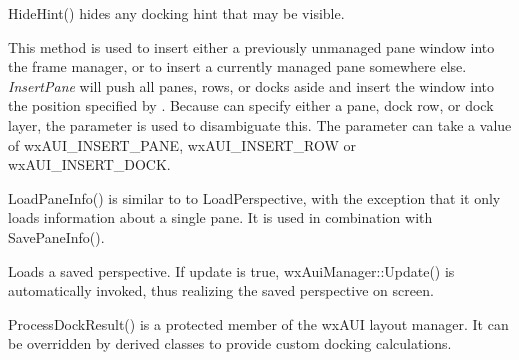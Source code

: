 
HideHint() hides any docking hint that may be visible.

\label{wxauimanagerinsertpane}


This method is used to insert either a previously unmanaged pane window
into the frame manager, or to insert a currently managed pane somewhere 
else. {\it InsertPane} will push all panes, rows, or docks aside and
insert the window into the position specified by . 
Because  can specify either a pane, dock row, or dock
layer, the  parameter is used to disambiguate this. The
parameter  can take a value of wxAUI\_INSERT\_PANE, wxAUI\_INSERT\_ROW 
or wxAUI\_INSERT\_DOCK.

\label{wxauimanagerloadpaneinfo}


LoadPaneInfo() is similar to to LoadPerspective, with the exception that it only loads information about a single pane.  It is used in combination with SavePaneInfo().

\label{wxauimanagerloadperspective}


Loads a saved perspective. If update is true, wxAuiManager::Update()
is automatically invoked, thus realizing the saved perspective on screen.

\label{wxauimanagerprocessdockresult}


ProcessDockResult() is a protected member of the wxAUI layout manager.  It can be overridden by derived classes to provide custom docking calculations.

\label{wxauimanagersavepaneinfo}


